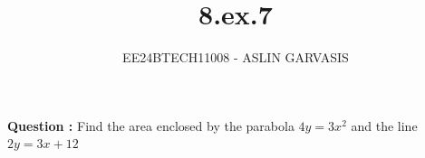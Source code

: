 \documentclass[journal]{IEEEtran}
\begin{document}

\vspace{3cm}

\title{8.ex.7}
\author{EE24BTECH11008 - ASLIN GARVASIS}
{\let\newpage\relax\maketitle}
\renewcommand{\thefigure}{\theenumi}
\renewcommand{\thetable}{\theenumi}
\setlength{\intextsep}{10pt} %

\textbf{Question : } Find the area enclosed by the parabola $4y=3x^2$ and the line $2y=3x+12$ \\
\end{document}
